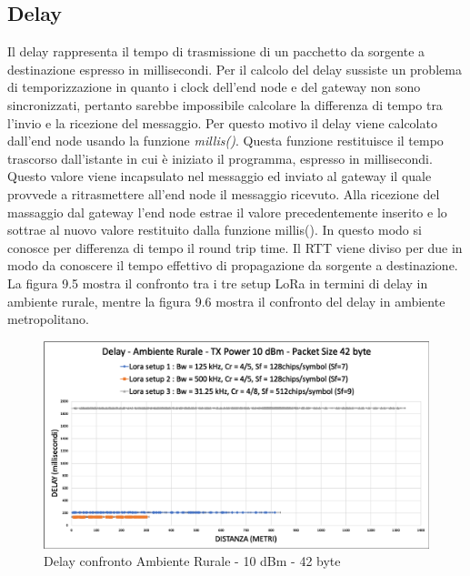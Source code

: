 \documentclass[12pt,a4paper,openright,twoside]{report}
\begin{document}
\subsection{Delay}
Il delay rappresenta il tempo di trasmissione di un pacchetto da sorgente a destinazione espresso in millisecondi. Per il calcolo del delay sussiste un problema di temporizzazione in quanto i clock dell'end node e del gateway non sono sincronizzati, pertanto sarebbe impossibile calcolare la differenza di tempo tra l'invio e la ricezione del messaggio. Per questo motivo il delay viene calcolato dall'end node usando la funzione \textit{millis()}. Questa funzione restituisce il tempo trascorso dall'istante in cui \`e iniziato il programma, espresso in millisecondi. Questo valore viene incapsulato nel messaggio ed inviato al gateway il quale provvede a ritrasmettere all'end node il messaggio ricevuto. Alla ricezione del massaggio dal gateway l'end node estrae il valore precedentemente inserito e lo sottrae al nuovo valore restituito dalla funzione millis(). In questo modo si conosce per differenza di tempo il round trip time. Il RTT viene diviso per due in modo da conoscere il tempo effettivo di propagazione da sorgente a destinazione.  La figura 9.5 mostra il confronto tra i tre setup LoRa in termini di delay in ambiente rurale, mentre la figura 9.6 mostra il confronto del delay in ambiente metropolitano.

\begin{figure}[h]                      
\begin{center} 
\includegraphics[width=\textwidth]{DELAY_confronto_AR_10dBm_42byte.png}
\caption[Delay confronto Ambiente Rurale - 10 dBm - 42 byte]{Delay confronto Ambiente Rurale - 10 dBm - 42 byte}\label{fig:prima}
\end{center}
\end{figure}
\end{document}
